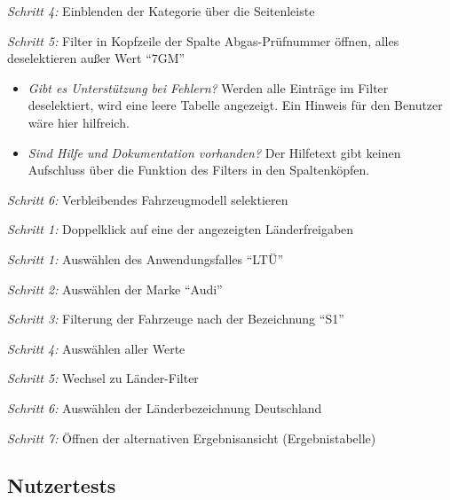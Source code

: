\textit{Schritt 4:} Einblenden der Kategorie \editHere{} über die Seitenleiste\par
\textit{Schritt 5:} Filter in Kopfzeile der Spalte Abgas-Prüfnummer öffnen, alles deselektieren außer Wert \enquote{7GM}\par
\begin{itemize}
 \item \textit{Gibt es Unterstützung bei Fehlern?} Werden alle Einträge im Filter deselektiert, wird eine leere Tabelle angezeigt. Ein Hinweis für den Benutzer wäre hier hilfreich.\par
 \item \textit{Sind Hilfe und Dokumentation vorhanden?} Der Hilfetext gibt keinen Aufschluss über die Funktion des Filters in den Spaltenköpfen.\par
\end{itemize}
\textit{Schritt 6:} Verbleibendes Fahrzeugmodell selektieren \par
{}\par
\textit{Schritt 1:} Doppelklick auf eine der angezeigten Länderfreigaben\par
{}\par
\textit{Schritt 1:} Auswählen des Anwendungsfalles \enquote{LTÜ}\par
\textit{Schritt 2:} Auswählen der Marke \enquote{Audi}\par
\textit{Schritt 3:} Filterung der Fahrzeuge nach der Bezeichnung \enquote{S1}\par
\textit{Schritt 4:} Auswählen aller Werte\par
\textit{Schritt 5:} Wechsel zu Länder-Filter\par
\textit{Schritt 6:} Auswählen der Länderbezeichnung Deutschland\par
\textit{Schritt 7:} Öffnen der alternativen Ergebnisansicht (Ergebnistabelle)\par
\subsection{Nutzertests}